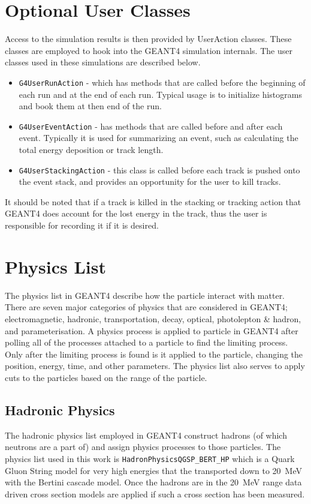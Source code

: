 \section{Optional User Classes}
Access to the simulation results is then provided by UserAction classes.
These classes are employed to hook into the GEANT4 simulation internals.
The user classes used in these simulations are described below.
\begin{itemize}
  \item \verb+G4UserRunAction+ - which has methods that are called before the beginning of each run and at the end of each run. Typical usage is to initialize histograms and book them at then end of the run.
  \item \verb+G4UserEventAction+ - has methods that are called before and after each event. Typically it is used for summarizing an event, such as calculating the total energy deposition or track length.
  \item \verb+G4UserStackingAction+ - this class is called before each track is pushed onto the event stack, and provides an opportunity for the user to kill tracks.
\end{itemize}
It should be noted that if a track is killed in the stacking or tracking action that GEANT4 does account for the lost energy in the track, thus the user is responsible for recording it if it is desired.

\section{Physics List}
The physics list in GEANT4 describe how the particle interact with matter.
There are seven major categories of physics that are considered in GEANT4; electromagnetic, hadronic, transportation, decay, optical, photolepton \& hadron, and parameterisation.
A physics process is applied to particle in GEANT4 after polling all of the processes attached to a particle to find the limiting process.
Only after the limiting process is found is it applied to the particle, changing the position, energy, time, and other parameters.
The physics list also serves to apply cuts to the particles based on the range of the particle.

\subsection{Hadronic Physics}
The hadronic physics list employed in GEANT4 construct hadrons (of which neutrons are a part of) and assign physics processes to those particles.
The physics list used in this work is \verb+HadronPhysicsQGSP_BERT_HP+ which is a Quark Gluon String model for very high energies that the transported down to \SI{20}{\MeV} with the Bertini cascade model.
Once the hadrons are in the \SI{20}{\MeV} range data driven cross section models are applied if such a cross section has been measured.

